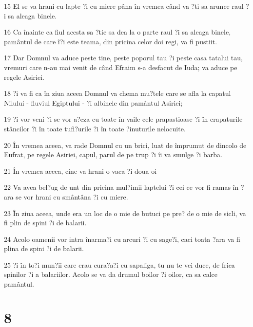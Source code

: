 \par 15 El se va hrani cu lapte ?i cu miere pâna în vremea când va ?ti sa arunce raul ?i sa aleaga binele.
\par 16 Ca înainte ca fiul acesta sa ?tie sa dea la o parte raul ?i sa aleaga binele, pamântul de care î?i este teama, din pricina celor doi regi, va fi pustiit.
\par 17 Dar Domnul va aduce peste tine, peste poporul tau ?i peste casa tatalui tau, vremuri care n-au mai venit de când Efraim s-a desfacut de Iuda; va aduce pe regele Asiriei.
\par 18 ?i va fi ca în ziua aceea Domnul va chema mu?tele care se afla la capatul Nilului - fluviul Egiptului - ?i albinele din pamântul Asiriei;
\par 19 ?i vor veni ?i se vor a?eza cu toate în vaile cele prapastioase ?i în crapaturile stâncilor ?i în toate tufi?urile ?i în toate ?inuturile nelocuite.
\par 20 În vremea aceea, va rade Domnul cu un brici, luat de împrumut de dincolo de Eufrat, pe regele Asiriei, capul, parul de pe trup ?i îi va smulge ?i barba.
\par 21 În vremea aceea, cine va hrani o vaca ?i doua oi
\par 22 Va avea bel?ug de unt din pricina mul?imii laptelui ?i cei ce vor fi ramas în ?ara se vor hrani cu smântâna ?i cu miere.
\par 23 În ziua aceea, unde era un loc de o mie de butuci pe pre? de o mie de sicli, va fi plin de spini ?i de balarii.
\par 24 Acolo oamenii vor intra înarma?i cu arcuri ?i cu sage?i, caci toata ?ara va fi plina de spini ?i de balarii.
\par 25 ?i în to?i mun?ii care erau cura?a?i cu sapaliga, tu nu te vei duce, de frica spinilor ?i a balariilor. Acolo se va da drumul boilor ?i oilor, ca sa calce pamântul.

\chapter{8}

